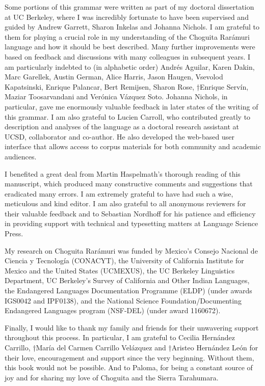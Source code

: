 Some portions of this grammar were written as part of my doctoral dissertation at UC Berkeley, where I was incredibly fortunate to have been supervised and guided by Andrew Garrett, Sharon Inkelas and Johanna Nichols. I am grateful to them for playing a crucial role in my understanding of the Choguita Rarámuri language and how it should be best described. Many further improvements were based on feedback and discussions with many colleagues in subsequent years. I am particularly indebted to (in alphabetic order) Andrés Aguilar, Karen Dakin, Marc Garellek, Austin German, Alice Harris, Jason Haugen, Vsevolod Kapatsinski, Enrique Palancar, Bert Remijsen, Sharon Rose, †Enrique Servín, Maziar Toosarvandani and Verónica Vázquez Soto. Johanna Nichols, in particular, gave me enormously valuable feedback in later states of the writing of this grammar. I am also grateful to Lucien Carroll, who contributed greatly to description and analyses of the language as a doctoral research assistant at UCSD, collaborator and co-author. He also developed the web-based user interface that allows access to corpus materials for both community and academic audiences. 

I benefited a great deal from Martin Haspelmath’s thorough reading of this manuscript, which produced many constructive comments and suggestions that eradicated many errors. I am extremely grateful to have had such a wise, meticulous and kind editor. I am also grateful to all anonymous reviewers for their valuable feedback and to Sebastian Nordhoff for his patience and efficiency in providing support with technical and typesetting matters at Language Science Press.

My research on Choguita Rarámuri was funded by Mexico’s Consejo Nacional de Ciencia y Tecnología (CONACYT), the University of California Institute for Mexico and the United States (UCMEXUS), the UC Berkeley Linguistics Department, UC Berkeley’s Survey of California and Other Indian Languages, the Endangered Languages Documentation Programme (ELDP) (under awards IGS0042 and IPF0138), and the National Science Foundation/Documenting Endangered Languages program (NSF-DEL) (under award 1160672).  

Finally, I would like to thank my family and friends for their unwavering support throughout this process. In particular, I am grateful to Cecilia Hernández Carrillo, †María del Carmen Carrillo Velázquez and †Aristeo Hernández León for their love, encouragement and support since the very beginning. Without them, this book would not be possible. And to Paloma, for being a constant source of joy and for sharing my love of Choguita and the Sierra Tarahumara.